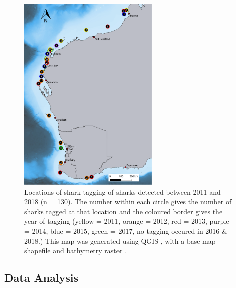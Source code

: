 \documentclass[11pt,a4paper]{article}
\begin{document}
\begin{figure}
	\centering\includegraphics[width=0.6\textwidth]{../Results/Release_map.pdf}
	\caption{Locations of shark tagging of sharks detected between 2011 and 2018 (n = 130). The number within each circle gives the number of sharks tagged at that location and the coloured border gives the year of tagging (yellow = 2011, orange = 2012, red = 2013, purple = 2014, blue = 2015, green = 2017, no tagging occured in 2016 \& 2018.) This map was generated using QGIS \citep{QGISDevelopmentTeam2019}, with a base map shapefile \citep{AustralianBureauofStatistics2011} and bathymetry raster \citep{Whiteway2009}.}
	\label{releases}
\end{figure}

	
	\subsection{Data Analysis}
	
\end{document}
